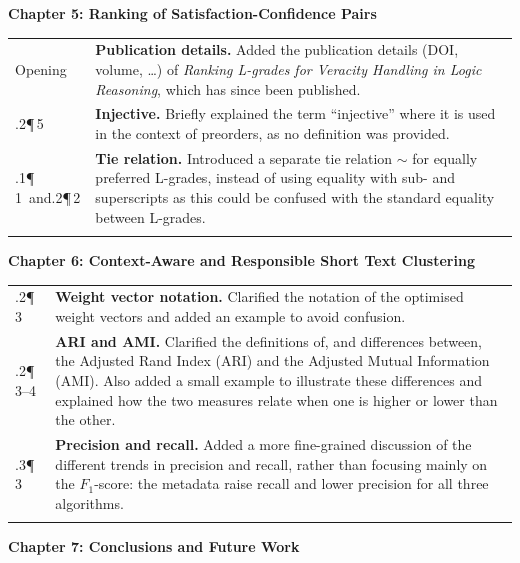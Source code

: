 \documentclass[11pt,a4paper]{article}
\makeatletter
\newcommand{\heading}[1]{%
  \par\addvspace{1.5em}%
  {\raggedright\large\bfseries #1\par}\nopagebreak[4]%
  \vspace{0.2em}\nopagebreak[4]%
}
\newlength{\loccol}
\newenvironment{changes}{%
  \begin{tabular}{@{}>{\raggedright\arraybackslash}p{\loccol}
                     >{\raggedright\arraybackslash}p{\dimexpr\textwidth-\loccol-2\tabcolsep\relax}@{}}
    \toprule
}{%
    \bottomrule
  \end{tabular}\par
}
\newcommand{\change}[2]{#1 & #2 \\ \addlinespace[0.45em]}
\newcommand{\loc}[2]{#1\enspace #2}
\newcommand{\sub}[1]{\newline{\footnotesize\itshape #1}}
\newcommand{\topic}[1]{\textbf{#1.}}
\makeatother
\begin{document}
\heading{Chapter 5: Ranking of Satisfaction-Confidence Pairs}

\begin{changes}
  \change{\loc{Opening}{}}{\topic{Publication details} Added the publication details (DOI, volume, \dots) of \textit{Ranking L-grades for Veracity Handling in Logic Reasoning}, which has since been published.}
  \change{\loc{5.3.2}{¶\,5}}{\topic{Injective} Briefly explained the term ``injective'' where it is used in the context of preorders, as no definition was provided.}
  \change{\loc{5.4.1}{¶\,1}\ and\newline\loc{5.4.2}{¶\,2}}{\topic{Tie relation} Introduced a separate tie relation $\sim$ for equally preferred L-grades, instead of using equality with sub- and superscripts as this could be confused with the standard equality between L-grades.}
\end{changes}

\heading{Chapter 6: Context-Aware and Responsible Short Text Clustering}

\begin{changes}
  \change{\loc{6.5.2}{¶\,3}\sub{Similarity Inputs and Weight Vector Configurations}}{\topic{Weight vector notation} Clarified the notation of the optimised weight vectors and added an example to avoid confusion.}
  \change{\loc{6.5.2}{¶\,3--4}\sub{Quality Measures, Adjusted Mutual Information (AMI)}}{\topic{ARI and AMI} Clarified the definitions of, and differences between, the Adjusted Rand Index (ARI) and the Adjusted Mutual Information (AMI). Also added a small example to illustrate these differences and explained how the two measures relate when one is higher or lower than the other.}
  \change{\loc{6.5.3}{¶\,3}\sub{Context-Aware Similarity Clustering}}{\topic{Precision and recall} Added a more fine-grained discussion of the different trends in precision and recall, rather than focusing mainly on the $F_1$-score: the metadata raise recall and lower precision for all three algorithms.}
\end{changes}

\heading{Chapter 7: Conclusions and Future Work}
\end{document}
